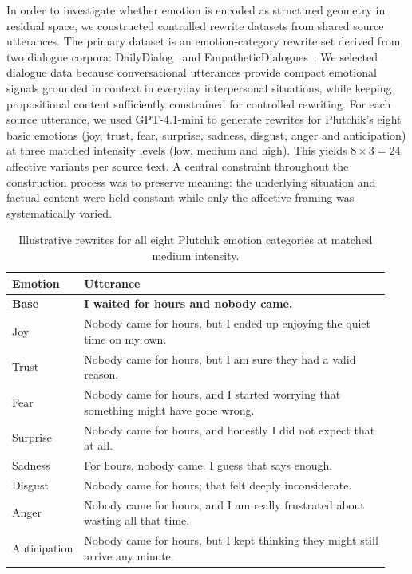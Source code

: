 In order to investigate whether emotion is encoded as structured geometry in residual space, we constructed controlled rewrite datasets from shared source utterances. The primary dataset is an emotion-category rewrite set derived from two dialogue corpora: DailyDialog~\cite{li2017dailydialogmanuallylabelledmultiturn} and EmpatheticDialogues~\cite{rashkin2019empatheticopendomainconversationmodels}. We selected dialogue data because conversational utterances provide compact emotional signals grounded in context in everyday interpersonal situations, while keeping propositional content sufficiently constrained for controlled rewriting. For each source utterance, we used GPT-4.1-mini to generate rewrites for Plutchik's eight basic emotions (joy, trust, fear, surprise, sadness, disgust, anger and anticipation) at three matched intensity levels (low, medium and high). This yields $8\times3 = 24$ affective variants per source text. A central constraint throughout the construction process was to preserve meaning: the underlying situation and factual content were held constant while only the affective framing was systematically varied.

\begin{table}[H]
\centering
\small
\begin{tabular}{p{0.12\linewidth} p{0.82\linewidth}}
\toprule
\textbf{Emotion} & \textbf{Utterance} \\
\midrule
\textbf{Base} & \textbf{I waited for hours and nobody came.} \\
Joy & Nobody came for hours, but I ended up enjoying the quiet time on my own. \\
Trust & Nobody came for hours, but I am sure they had a valid reason. \\
Fear & Nobody came for hours, and I started worrying that something might have gone wrong. \\
Surprise & Nobody came for hours, and honestly I did not expect that at all. \\
Sadness & For hours, nobody came. I guess that says enough. \\
Disgust & Nobody came for hours; that felt deeply inconsiderate. \\
Anger & Nobody came for hours, and I am really frustrated about wasting all that time. \\
Anticipation & Nobody came for hours, but I kept thinking they might still arrive any minute. \\
\bottomrule
\end{tabular}
\caption{Illustrative rewrites for all eight Plutchik emotion categories at matched medium intensity.}
\label{tab:emotion_rewrite_example}
\end{table}

